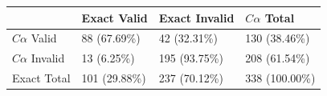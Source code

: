 \begin{tabular}{llll}
\toprule
 & Exact Valid & Exact Invalid & $C\alpha$ Total \\
\midrule
$C\alpha$ Valid & 88 (67.69\%) & 42 (32.31\%) & 130 (38.46\%) \\
$C\alpha$ Invalid & 13 (6.25\%) & 195 (93.75\%) & 208 (61.54\%) \\
Exact Total & 101 (29.88\%) & 237 (70.12\%) & 338 (100.00\%) \\
\bottomrule
\end{tabular}

